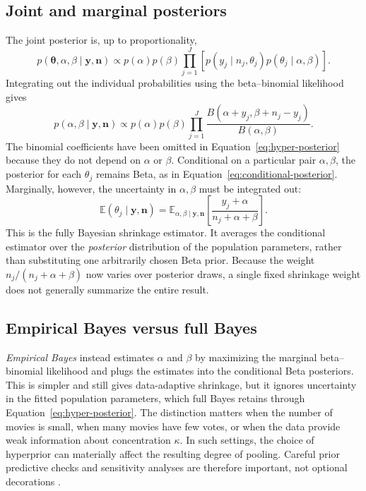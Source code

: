 \documentclass[11pt,a4paper]{article}
\newcommand{\E}{\mathbb{E}}
\begin{document}
\subsection{Joint and marginal posteriors}
The joint posterior is, up to proportionality,
\begin{equation}
 p(\bm\theta,\alpha,\beta\mid\bm y,\bm n)
 \propto p(\alpha)p(\beta)
 \prod_{j=1}^{J}\!\left[
 p(y_j\mid n_j,\theta_j)p(\theta_j\mid\alpha,\beta)
 \right].
 \label{eq:joint-posterior}
\end{equation}
Integrating out the individual probabilities using the beta--binomial likelihood gives
\begin{equation}
 p(\alpha,\beta\mid\bm y,\bm n)
 \propto p(\alpha)p(\beta)
 \prod_{j=1}^{J}
 \frac{B(\alpha+y_j,\beta+n_j-y_j)}{B(\alpha,\beta)}.
 \label{eq:hyper-posterior}
\end{equation}
The binomial coefficients have been omitted in Equation~\eqref{eq:hyper-posterior} because they do not depend on $\alpha$ or $\beta$. Conditional on a particular pair $\alpha,\beta$, the posterior for each $\theta_j$ remains Beta, as in Equation~\eqref{eq:conditional-posterior}. Marginally, however, the uncertainty in $\alpha,\beta$ must be integrated out:
\begin{equation}
 \E(\theta_j\mid\bm y,\bm n)
 =\E_{\alpha,\beta\mid\bm y,\bm n}
 \left[\frac{y_j+\alpha}{n_j+\alpha+\beta}\right].
 \label{eq:full-posterior-mean}
\end{equation}
This is the fully Bayesian shrinkage estimator. It averages the conditional estimator over the \emph{posterior} distribution of the population parameters, rather than substituting one arbitrarily chosen Beta prior. Because the weight $n_j/(n_j+\alpha+\beta)$ now varies over posterior draws, a single fixed shrinkage weight does not generally summarize the entire result.

\subsection{Empirical Bayes versus full Bayes}
\emph{Empirical Bayes} instead estimates $\alpha$ and $\beta$ by maximizing the marginal beta--binomial likelihood and plugs the estimates into the conditional Beta posteriors. This is simpler and still gives data-adaptive shrinkage, but it ignores uncertainty in the fitted population parameters, which full Bayes retains through Equation~\eqref{eq:hyper-posterior}. The distinction matters when the number of movies is small, when many movies have few votes, or when the data provide weak information about concentration $\kappa$. In such settings, the choice of hyperprior can materially affect the resulting degree of pooling. Careful prior predictive checks and sensitivity analyses are therefore important, not optional decorations \cite{gelman2006,gelmanetal2013}.
\end{document}
